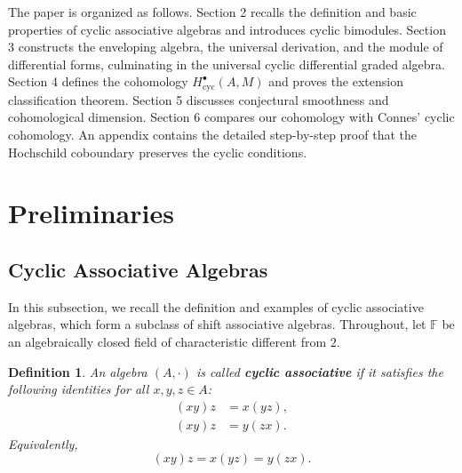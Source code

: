 \documentclass[pdflatex,sn-mathphys-num]{sn-jnl}%
\theoremstyle{thmstyleone}%
\newtheorem{definition}{Definition}[section]
\theoremstyle{thmstyletwo}%
\theoremstyle{thmstylethree}%
\begin{document}
The paper is organized as follows. Section 2 recalls the definition and basic properties of cyclic associative algebras and introduces cyclic bimodules. Section 3 constructs the enveloping algebra, the universal derivation, and the module of differential forms, culminating in the universal cyclic differential graded algebra. Section 4 defines the cohomology $H^\bullet_{\mathrm{cyc}}(A, M)$ and proves the extension classification theorem. Section 5 discusses conjectural smoothness and cohomological dimension. Section 6 compares our cohomology with Connes' cyclic cohomology. An appendix contains the detailed step-by-step proof that the Hochschild coboundary preserves the cyclic conditions.







\section{Preliminaries}

\subsection{Cyclic Associative Algebras}

In this subsection, we recall the definition and examples of cyclic associative algebras, which form a subclass of shift associative algebras. Throughout, let $\mathbb{F}$ be an algebraically closed field of characteristic different from $2$.

\begin{definition}\cite{Abdelwahab2025}
An algebra $(A, \cdot)$ is called \textbf{cyclic associative} if it satisfies the following identities for all $x, y, z \in A$:
\begin{align}
(xy)z &= x(yz), \label{eq:assoc}\\
(xy)z &= y(zx). \label{eq:cyclic}
\end{align}
Equivalently,
\[
(xy)z = x(yz) = y(zx).
\]
\end{definition}
\end{document}
